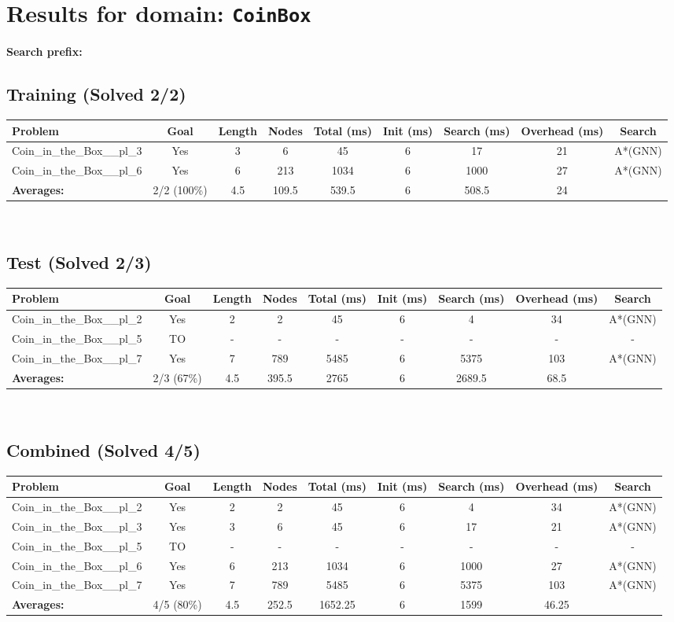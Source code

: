 \documentclass{article}
\begin{document}
\section*{Results for domain: \texttt{CoinBox}}
\textbf{Search prefix:} 
\\[0.5cm]
\subsection*{Training (Solved 2/2)}
\begin{tabular}{lcccccccc}
\toprule
Problem & Goal & Length & Nodes & Total (ms) & Init (ms) & Search (ms) & Overhead (ms) & Search \\
\midrule
Coin\_in\_the\_Box\_\_pl\_3 & Yes & 3 & 6 & 45 & 6 & 17 & 21 & A*(GNN) \\
Coin\_in\_the\_Box\_\_pl\_6 & Yes & 6 & 213 & 1034 & 6 & 1000 & 27 & A*(GNN) \\
\textbf{Averages:} & 2/2 (100\%) & 4.5 & 109.5 & 539.5 & 6 & 508.5 & 24 & \\
\bottomrule
\end{tabular}
\\[0.7cm]
\subsection*{Test (Solved 2/3)}
\begin{tabular}{lcccccccc}
\toprule
Problem & Goal & Length & Nodes & Total (ms) & Init (ms) & Search (ms) & Overhead (ms) & Search \\
\midrule
Coin\_in\_the\_Box\_\_pl\_2 & Yes & 2 & 2 & 45 & 6 & 4 & 34 & A*(GNN) \\
Coin\_in\_the\_Box\_\_pl\_5 & TO & - & - & - & - & - & - & - \\
Coin\_in\_the\_Box\_\_pl\_7 & Yes & 7 & 789 & 5485 & 6 & 5375 & 103 & A*(GNN) \\
\textbf{Averages:} & 2/3 (67\%) & 4.5 & 395.5 & 2765 & 6 & 2689.5 & 68.5 & \\
\bottomrule
\end{tabular}
\\[0.7cm]
\subsection*{Combined (Solved 4/5)}
\begin{tabular}{lcccccccc}
\toprule
Problem & Goal & Length & Nodes & Total (ms) & Init (ms) & Search (ms) & Overhead (ms) & Search \\
\midrule
Coin\_in\_the\_Box\_\_pl\_2 & Yes & 2 & 2 & 45 & 6 & 4 & 34 & A*(GNN) \\
Coin\_in\_the\_Box\_\_pl\_3 & Yes & 3 & 6 & 45 & 6 & 17 & 21 & A*(GNN) \\
Coin\_in\_the\_Box\_\_pl\_5 & TO & - & - & - & - & - & - & - \\
Coin\_in\_the\_Box\_\_pl\_6 & Yes & 6 & 213 & 1034 & 6 & 1000 & 27 & A*(GNN) \\
Coin\_in\_the\_Box\_\_pl\_7 & Yes & 7 & 789 & 5485 & 6 & 5375 & 103 & A*(GNN) \\
\textbf{Averages:} & 4/5 (80\%) & 4.5 & 252.5 & 1652.25 & 6 & 1599 & 46.25 & \\
\bottomrule
\end{tabular}
\\[0.7cm]
\end{document}
